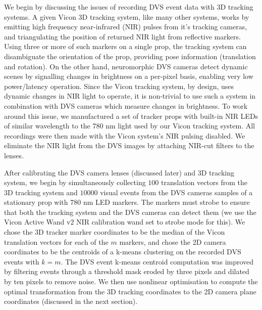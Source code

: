 \documentclass{article}
\begin{document}
We begin by discussing the issues of recording DVS event data with 3D tracking systems. A given Vicon 3D tracking system, like many other systems, works by emitting high frequency near-infrared (NIR) pulses from it's tracking cameras, and triangulating the position of returned NIR light from reflective markers. Using three or more of such markers on a single prop, the tracking system can disambiguate the orientation of the prop, providing pose information (translation and rotation). On the other hand, neuromorphic DVS cameras detect dynamic scenes by signalling changes in brightness on a per-pixel basis, enabling very low power/latency operation. Since the Vicon tracking system, by design, uses dynamic changes in NIR light to operate, it is non-trivial to use such a system in combination with DVS cameras which measure changes in brightness. To work around this issue, we manufactured a set of tracker props with built-in NIR LEDs of similar wavelength to the 780 nm light used by our Vicon tracking system. All recordings were then made with the Vicon system's NIR pulsing disabled. We eliminate the NIR light from the DVS images by attaching NIR-cut filters to the lenses.

After calibrating the DVS camera lenses (discussed later) and 3D tracking system, we begin by simultaneously collecting $100$ translation vectors from the 3D tracking system and $10000$ visual events from the DVS cameras samples of a stationary prop with 780 nm LED markers. The markers must strobe to ensure that both the tracking system and the DVS cameras can detect them (we use the Vicon Active Wand v2 NIR calibration wand set to strobe mode for this). We chose the 3D tracker marker coordinates to be the median of the Vicon translation vectors for each of the $m$ markers, and chose the 2D camera coordinates to be the centroids of a k-means clustering on the recorded DVS events with $k = m$. The DVS event k-means centroid computation was improved by filtering events through a threshold mask eroded by three pixels and dilated by ten pixels to remove noise. We then use nonlinear optimisation to compute the optimal transformation from the 3D tracking coordinates to the 2D camera plane coordinates (discussed in the next section).
\end{document}
